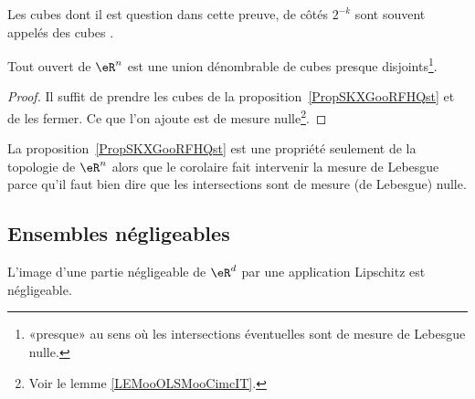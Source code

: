 				Les cubes dont il est question dans cette preuve, de côtés \( 2^{-k}\) sont souvent appelés des cubes .

				\begin{corollary}     \label{CorTHDQooWMSbJe}
				Tout ouvert de \( \eR^n\) est une union dénombrable de cubes presque disjoints\footnote{«presque» au sens où les intersections éventuelles sont de mesure de Lebesgue nulle.}.
				\end{corollary}

				\begin{proof}
				Il suffit de prendre les cubes de la proposition~\ref{PropSKXGooRFHQst} et de les fermer. Ce que l'on ajoute est de mesure nulle\footnote{Voir le lemme \ref{LEMooOLSMooCimcIT}.}.
				\end{proof}

				\begin{remark}
				La proposition~\ref{PropSKXGooRFHQst} est une propriété seulement de la topologie de \( \eR^n\) alors que le corolaire fait intervenir la mesure de Lebesgue parce qu'il faut bien dire que les intersections sont de mesure (de Lebesgue) nulle.
				\end{remark}

				\subsection{Ensembles négligeables}

				\begin{lemma}      \label{LemWHKJooGPuxEN}
				L'image d'une partie négligeable de \( \eR^d\) par une application Lipschitz est négligeable.
				\end{lemma}

